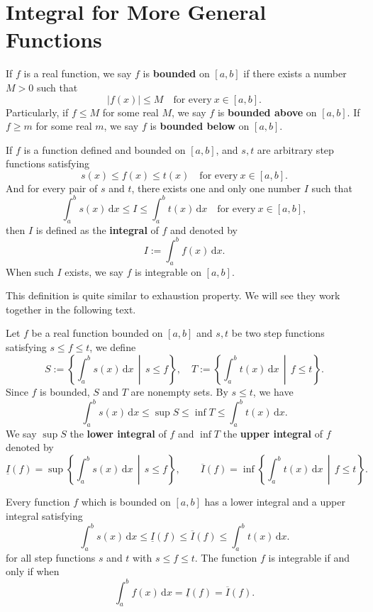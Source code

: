 	\section{Integral for More General Functions}
	\begin{definitionenv}
		If $f$ is a real function, we say $f$ is \textbf{bounded} on $[a,b]$ if there exists a number $M>0$ such that  
		\[
		|f(x)|\le M \quad \text{for every}\ x\in [a,b].
		\]
        Particularly, if $f \le M$ for some real $M$, we say $f$ is \textbf{bounded above} on $[a,b]$. If $f \ge m$ for some real $m$, we say $f$ is \textbf{bounded below} on $[a,b]$.
	\end{definitionenv}
	\begin{definitionenv}
		If $f$ is a function defined and bounded on $[a,b]$, and $s,t$ are arbitrary step functions satisfying
		\[ s(x)\le f(x)\le t(x) \quad \text{for every}\ x\in[a,b].\]
		And for every pair of $s$ and $t$, there exists one and only one number $I$ such that
		\[\int_a^b s(x)\,\mathrm{d}x\le I \le \int_a^b t(x)\,\mathrm{d}x \quad \text{for every}\ x\in[a,b],\]
		then $I$ is defined as the \textbf{integral} of $f$ and denoted by
		\[ I:=\int_a^b f(x)\,\mathrm{d}x.\]
		When such $I$ exists, we say $f$ is integrable on $[a,b]$.
	\end{definitionenv}
	\begin{remarkenv}
		This definition is quite similar to exhaustion property. We will see they work together in the following text.
	\end{remarkenv}
	\begin{definitionenv}
		Let $f$ be a real function bounded on $[a,b]$ and $s,t$ be two step functions satisfying $s\le f\le t$, we define
		\[
		S:=\left\{\int_a^b s(x)\,\mathrm{d}x\, \middle|\, s\le f\right\},
		\quad
		T:=\left\{\int_a^b t(x)\,\mathrm{d}x\, \middle|\, f\le t\right\}.
		\]
		Since $f$ is bounded, $S$ and $T$ are nonempty sets. By $s\le t$, we have 
		\[
		\int_a^b s(x)\,\mathrm{d}x \le \sup S\le \inf T\le \int_a^b t(x)\,\mathrm{d}x.
		\]
		We say $\sup S$ the \textbf{lower integral} of $f$ and $\inf T$ the \textbf{upper integral} of $f$ denoted by
		\[
		\underline{I}(f) = \sup \left\{ \int_a^b s(x) \, \mathrm{d}x \,\middle|\, s \le f \right\}, 
		\qquad 
		\overline{I}(f) = \inf \left\{ \int_a^b t(x) \, \mathrm{d}x \,\middle|\, f \le t \right\}.
		\]
	\end{definitionenv}
	\begin{theoremenv}
		Every function $f$ which is bounded on $[a,b]$ has a lower integral and a upper integral satisfying
		\[
		\int_a^b s(x) \, \mathrm{d}x 
		\le \underline{I}(f) 
		\le \overline{I}(f) 
		\le \int_a^b t(x) \, \mathrm{d}x.
		\]
		for all step functions $s$ and $t$ with $s\le f\le t$. The function $f$ is integrable if and only if when
		\[
		\int_a^b f(x) \, \mathrm{d}x = \underline{I}(f) = \overline{I}(f).
		\]
	\end{theoremenv}
